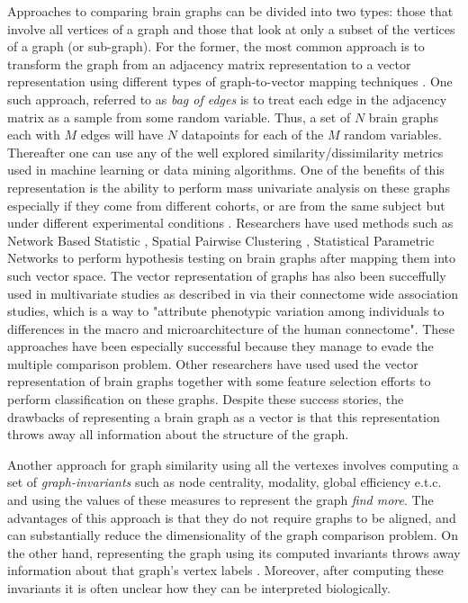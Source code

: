 Approaches to comparing brain graphs can be divided into two types: those that involve all vertices of a graph and those that look at only a subset of the vertices of a graph (or sub-graph). For the former, the most common approach is to transform the graph from an adjacency matrix representation to a vector representation using different types of graph-to-vector mapping techniques \cite{Ravindran}. One such approach, referred to as \emph{bag of edges} is to treat each edge in the adjacency matrix as a sample from some random variable. Thus, a set of $N$ brain graphs each with $M$ edges will have $N$ datapoints for each of the $M$ random variables. Thereafter one can use any of the well explored similarity/dissimilarity metrics used in machine learning or data mining algorithms. One of the benefits of this representation is the ability to perform mass univariate analysis on these graphs especially if they come from different cohorts, or are from the same subject but under different experimental conditions \cite{Hutchinsons2013, Ginestet2013}. Researchers have used methods such as Network Based Statistic \cite{Zalesky2011}, Spatial Pairwise Clustering \cite{Zalesky2012}, Statistical Parametric Networks \cite{Ginestet2013} to perform hypothesis testing on brain graphs after mapping them into such vector space. The vector representation of graphs has also been succeffully used in multivariate studies as described in \cite{Milham2012, Shehzad2013} via their connectome wide association studies, which is a way to "attribute phenotypic variation among individuals to differences in the macro and microarchitecture of the human connectome". These approaches have been especially successful because they manage to evade the multiple comparison problem. Other researchers \cite{Richiardi2011, Craddock2009} have used  used the vector representation  of brain graphs together with some feature selection efforts to perform classification on these graphs. Despite these success stories, the drawbacks of representing a brain graph as a vector is that this representation throws away all information about the structure of the graph.

Another approach for graph similarity using all the vertexes involves computing a set of \emph{graph-invariants} such as node centrality, modality, global efficiency e.t.c. and using the values of these measures to represent the graph \cite{rubinov} \textit{find more}. The advantages of this approach is that they do not require graphs to be aligned, and can substantially reduce the dimensionality of the graph comparison problem. On the other hand, representing the graph using its computed invariants throws away information about that graph's vertex labels \cite{Vogelstein2012}. Moreover, after computing these invariants it is often unclear how they can be interpreted biologically.

